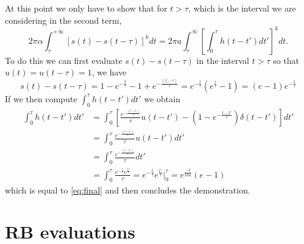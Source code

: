 At this point we only have to show that for $t>\tau$, which is the interval we are considering in the second term, 
\begin{equation}
    2\pi\alpha \int_{\tau}^{+\infty} \left[ s(t) - s(t-\tau) \right]^k dt = 2\pi a \int_{\tau}^{\infty} \left[ \int_{0}^{\tau} h(t - t') dt' \right]^k dt.
\end{equation}
%
To do this we can first evaluate $s(t)-s(t-\tau)$ in the interval $t>\tau$ so that $u(t)=u(t-\tau)=1$, we have
\begin{equation}\label{eq:final}
    s(t) - s(t-\tau) = 1- e^{-\frac{t}{\tau}} - 1 + e^{-\frac{(t-\tau)}{\tau}} = e^{-\frac{t}{\tau}} \left(e^{\frac{\tau}{\tau}}-1\right) = (e-1)e^{-\frac{t}{\tau}}
\end{equation}
%
If we then compute $\int_{0}^{\tau} h(t - t')dt'$ we obtain
\begin{align}
    \int_{0}^{\tau} h(t-t')dt' &= \int_{0}^{\tau} \left[ \frac{e^{-\frac{(t-t')}{\tau}}}{\tau} u(t-t') - \left(1-e^{-\frac{t-t'}{\tau}}\right)\delta(t-t') \right] dt'\\
    &= \int_{0}^{\tau} \frac{e^{-\frac{(t-t')}{\tau}}}{\tau} u(t-t')dt' \\
    &= \int_{0}^{\tau} \frac{e^{-\frac{(t-t')}{\tau}}}{\tau} dt'\\
    &= \int_{0}^{\tau} \frac{e^{-\frac{t}{\tau}}e^{\frac{t'}{\tau}}}{\tau} = e^{-\frac{t}{\tau}}e^{\frac{t'}{\tau}}\Big|_{0}^{\tau} = e^{\frac{-t}{tau}}(e-1)
\end{align}
which is equal to \ref{eq:final} and then concludes the demonstration.

\chapter{RB evaluations}
\label{app:AppendixC}

